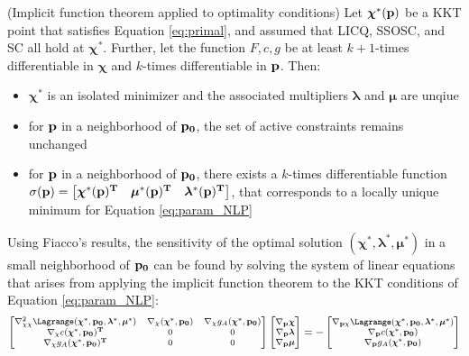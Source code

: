 \begin{theorem}{(Implicit function theorem applied to optimality conditions)}
	Let $\boldsymbol{\chi}^*(\bf{p})$ be a KKT point that satisfies Equation \ref{eq:primal}, and assumed that LICQ, SSOSC, and SC all hold at $\boldsymbol{\chi}^*$.
	Further, let the function $F,c,g$ be at least $k+1$-times differentiable in $\boldsymbol{\chi}$ and $k$-times differentiable in $\bf{p}$. Then:
	\begin{itemize}
		\item $\boldsymbol{\chi}^*$ is an isolated minimizer and the associated multipliers $\boldsymbol{\lambda}$ and $\boldsymbol{\mu}$ are unqiue
		\item for $\bf{p}$ in a neighborhood of $\bf{p}_0$, the set of active constraints remains unchanged
		\item for $\bf{p}$ in a neighborhood of $\bf{p}_0$, there exists a $k$-times differentiable function $\sigma(\bf{p})=\begin{bmatrix}\boldsymbol{\chi}^*(\bf{p})^T & \boldsymbol{\mu}^*(\bf{p})^T & \boldsymbol{\lambda}^*(\bf{p})^T\end{bmatrix}$, that corresponds to a locally unique minimum for Equation \ref{eq:param_NLP}
	\end{itemize}
\end{theorem}
\par
Using Fiacco's results, the sensitivity of the optimal solution $(\boldsymbol{\chi}^*, \boldsymbol{\lambda}^*,\boldsymbol{\mu}^*)$ in a small neighborhood of $\bf{p}_0$ can be found by solving the system of linear equations that arises from applying the implicit function theorem to the KKT conditions of Equation \ref{eq:param_NLP}:\\
	\begin{equation}
	\raisetag{1\baselineskip}
	{\footnotesize
		\begin{bmatrix}
			\nabla_{\chi\chi}^2\Lagrange(\boldsymbol{\chi}^*,\bf{p}_0, \boldsymbol{\lambda}^*,\boldsymbol{\mu}^*) & \nabla_{\chi}(\boldsymbol{\chi}^*,\bf{p}_0)&\nabla_{\chi}g_A(\boldsymbol{\chi}^*,\bf{p}_0)\\
			\nabla_{\chi}c(\boldsymbol{\chi}^*,\bf{p}_0)^T & 0 & 0\\
			\nabla_{\chi}g_A(\boldsymbol{\chi}^*,\bf{p}_0)^T & 0 & 0
		\end{bmatrix}
		\begin{bmatrix}
			\nabla_{\bf{p}}\boldsymbol{\chi}\\
			\nabla_{\bf{p}}\boldsymbol{\lambda}\\
			\nabla_{\bf{p}}\boldsymbol{\mu}
		\end{bmatrix}
		=-
		\begin{bmatrix}
			\nabla_{\bf{p}\chi}\Lagrange(\boldsymbol{\chi}^*, \bf{p}_0,\boldsymbol{\lambda}^*,\boldsymbol{\mu}^*)\\
			\nabla_{\bf{p}}c(\boldsymbol{\chi}^*,\bf{p}_0)\\
			\nabla_{\bf{p}}g_A(\boldsymbol{\chi}^*,\bf{p}_0)
		\end{bmatrix}
	}
	\label{eq:sensitivity}
	\end{equation}
